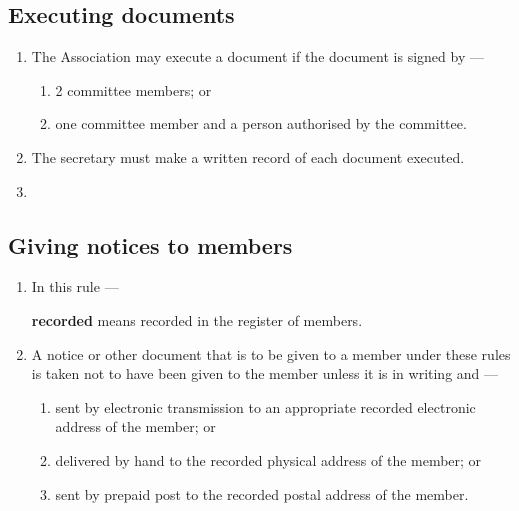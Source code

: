 \documentclass[../constitution.tex]{subfiles}
\begin{document}
\hypertarget{executing-documents}{%
\subsection{Executing documents}\label{executing-documents}}

\begin{enumerate}

\item The Association may execute a document if the document is signed by ---

  \begin{enumerate}
  
  \item 2 committee members; or
  \item one committee member and a person authorised by the committee.
  \end{enumerate}
\item The secretary must make a written record of each document executed.
\item {} 
\end{enumerate}

\hypertarget{giving-notices-to-members}{%
\subsection{Giving notices to members}\label{giving-notices-to-members}}

\begin{enumerate}

\item In this rule ---

  \textbf{recorded} means recorded in the register of members.

\item A notice or other document that is to be given to a member under these rules is taken not to have been given to the member unless it is in writing and ---

  \begin{enumerate}
  \item sent by electronic transmission to an appropriate recorded electronic address of the member; or 
  \item delivered by hand to the recorded physical address of the member; or
  \item sent by prepaid post to the recorded postal address of the member.
  \end{enumerate}
\end{enumerate}
\end{document}
